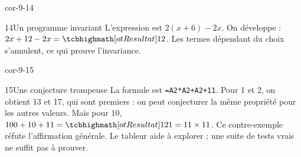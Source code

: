 \begin{blocLivre}{cor-9-14}\begin{corrige}{14}{Un programme invariant}
L’expression est $2(x+6)-2x$. On développe : $2x+12-2x=\res{12}$. Les termes dépendant du choix s’annulent, ce qui prouve l’invariance.
\end{corrige}\end{blocLivre}
\begin{blocLivre}{cor-9-15}\begin{corrige}{15}{Une conjecture trompeuse}
La formule est \texttt{=A2*A2+A2+11}. Pour 1 et 2, on obtient 13 et 17, qui sont premiers : on peut conjecturer la même propriété pour les autres valeurs. Mais pour 10, $100+10+11=\res{121=11\times11}$. Ce contre-exemple réfute l’affirmation générale. Le tableur aide à explorer ; une suite de tests vrais ne suffit pas à prouver.
\end{corrige}\end{blocLivre}

